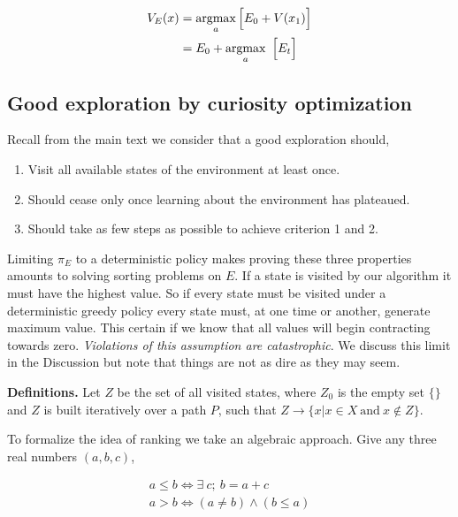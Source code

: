 \begin{equation}
	\label{eq:V_E2} 
	\begin{split}
	V_E(x) &= \operatorname*{argmax}_a \Big [ E_0 + V(x_1) \Big ] \\
		   &= E_0 + \operatorname*{argmax}_a \ \Big [ E_t \Big ] \\
	\end{split}
\end{equation}

\subsection*{Good exploration by curiosity optimization} 

Recall from the main text we consider that a good exploration should,

\begin{enumerate}
  \item Visit all available states of the environment at least once. 
  \item Should cease only once learning about the environment has plateaued. 
  \item Should take as few steps as possible to achieve criterion 1 and 2.
\end{enumerate}

Limiting $\pi_E$ to a deterministic policy makes proving these three properties amounts to solving sorting problems on $E$. If a state is visited by our algorithm it must have the highest value. So if every state must be visited under a deterministic greedy policy every state must, at one time or another, generate maximum value. This certain if we know that all values will begin contracting towards zero. \textit{Violations of this assumption are catastrophic}. We discuss this limit in the Discussion but note that things are not as dire as they may seem.

\textbf{Definitions.} Let $Z$ be the set of all visited states, where $Z_0$ is the empty set $\{\}$ and $Z$ is built iteratively over a path $P$, such that $Z \rightarrow \{x | x \in X\ \text{and}\ x \not\in Z\}$. 

To formalize the idea of ranking we take an algebraic approach. Give any three real numbers $(a,b,c)$,

\begin{align}\label{eq:ineq} 
	a \leq b \Leftrightarrow \exists \ c;\ b = a + c \\
	a > b \Leftrightarrow (a \neq b) \wedge (b \leq a) 
\end{align}

